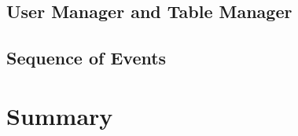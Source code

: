    \subsection{User Manager and Table Manager} \label{sec:user_table_manager}


    \subsection{Sequence of Events} \label{sec:sequence_events}





\section{Summary}


